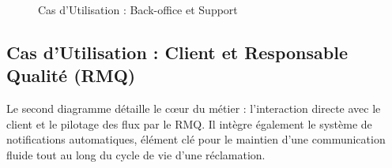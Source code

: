 \begin{figure}[H]
    \caption{Cas d'Utilisation : Back-office et Support}
\end{figure}

\subsection{Cas d'Utilisation : Client et Responsable Qualité (RMQ)}
Le second diagramme détaille le cœur du métier : l'interaction directe avec le client et le pilotage des flux par le RMQ. Il intègre également le système de notifications automatiques, élément clé pour le maintien d'une communication fluide tout au long du cycle de vie d'une réclamation.

